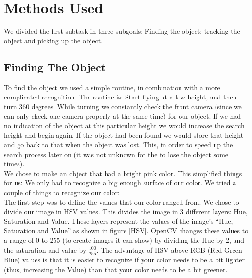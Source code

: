 \section{Methods Used}
We divided the first subtask in three subgoals: Finding the object; tracking the object and picking up the object. 

\subsection{Finding The Object}
To find the object we used a simple routine, in combination with a more complicated recognition. The routine is: Start flying at a low height, and then turn 360 degrees.
 While turning we constantly check the front camera (since we can only check one camera properly at the same time) for our object. If we had no indication of the object
at this particular height we would increase the search height and begin again.
If the object had been found we would store that height and go back to that when
the object was lost. This, in order to speed up the search process later on (it was not unknown for the \Ardrone to lose the object some times). \\

We chose to make an object that had a bright pink color. This simplified things
for us: We only had to recognize a big enough surface of our color. We tried a
	couple of things to recognize our color:\\

The first step was to define the values that our color ranged from. We chose to
divide our image in HSV values. This divides the image in 3 different layers:
Hue, Saturation and Value. These layers represent the values of the image's
``Hue, Saturation and Value'' as shown in figure \ref{HSV}. OpenCV changes these
values to a range of 0 to 255 (to create images it can show) by dividing the Hue
by 2, and the saturation and value by $\frac{100}{255}$. The advantage of HSV
above RGB (Red Green Blue) values is that it is easier to recognize if your
color needs to be a bit lighter (thus, increasing the Value) than that your
color needs to be a bit greener.\\

